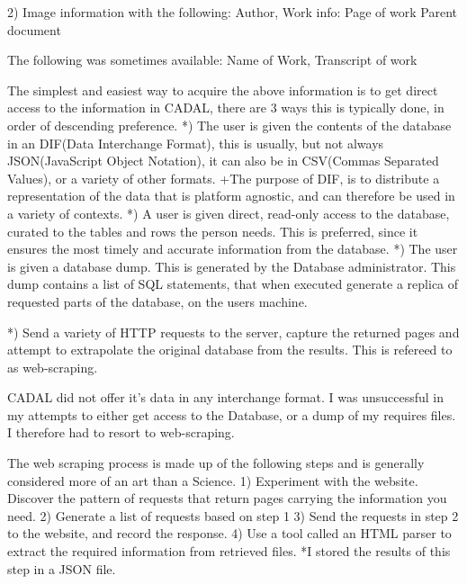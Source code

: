         2)  Image information with the following:
            Author,
            Work info:
                Page of work
                Parent document
            
            The following was sometimes available:
                Name of Work,
                Transcript of work
                
            The simplest and easiest way to acquire the above information is to get direct access to the information in CADAL, there are 3 ways this is typically done, in order of descending preference.
            *)  The user is given the contents of the database in an DIF(Data Interchange Format), this is usually, but not always JSON(JavaScript Object Notation), it can also be in CSV(Commas Separated Values), or a variety of other formats.
                +The purpose of DIF, is to distribute a representation of the data that is platform agnostic, and can  therefore be used in a variety of contexts.
            *)  A user is given direct, read-only access to the database, curated to the tables and rows the person needs.  This is preferred, since it ensures the most timely and accurate information from the database.
            *)  The user is given a database dump.  This is generated by the Database administrator.  This dump contains a list of SQL statements, that when executed generate a replica of requested parts of the database, on the users machine.

            *)  Send a variety of HTTP requests to the server, capture the returned pages and attempt to extrapolate the original database from the results.  This is refereed to as web-scraping.
            
            CADAL did not offer it's data in any interchange format.  I was unsuccessful in my attempts to either get access to the Database, or a dump of my requires files.  I therefore had to resort to web-scraping.
            
            The web scraping process is made up of the following steps and is generally considered more of an art than a Science.
                1)  Experiment with the website.  Discover the pattern of requests that return pages carrying the information you need.
                2)  Generate a list of requests based on step 1
                3)  Send the requests in step 2 to the website, and record the response.
                4)  Use a tool called an HTML parser to extract the required information from retrieved files.
                    *I stored the results of this step in a JSON file.
                
